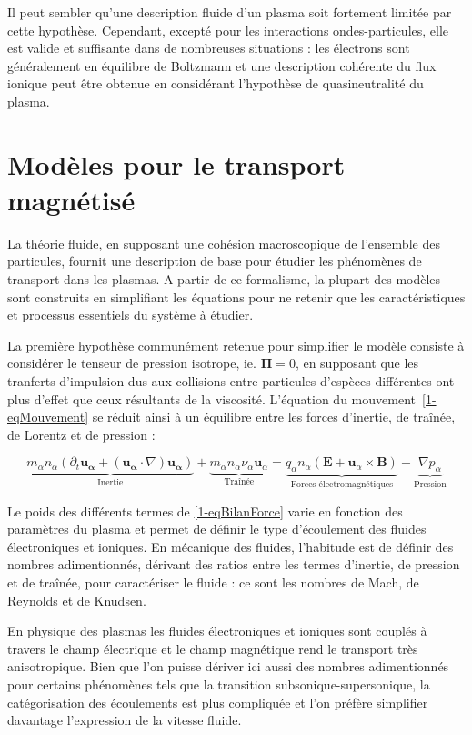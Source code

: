 \begin{refsection}
Il peut sembler qu'une description fluide d'un plasma soit fortement limitée
par cette hypothèse. Cependant, excepté pour les interactions
ondes-particules, elle est valide et suffisante dans de nombreuses
situations : les électrons sont généralement en équilibre de Boltzmann et une
description cohérente du flux ionique peut être obtenue en considérant l'hypothèse de quasineutralité du
plasma.

\section{Modèles pour le transport magnétisé}

La théorie fluide, en supposant une cohésion macroscopique de l'ensemble des
particules, fournit une description de base pour étudier les phénomènes de
transport dans les plasmas. A partir de ce formalisme, la plupart des modèles
sont construits en simplifiant les équations pour ne retenir que les
caractéristiques et processus essentiels du système à étudier. 

La première hypothèse communément retenue pour simplifier le modèle consiste à
considérer le tenseur de pression isotrope, ie.
$\boldsymbol{\Pi}=0$, en supposant que les tranferts d'impulsion dus
aux collisions entre particules d'espèces différentes ont plus d'effet que
ceux résultants de la viscosité. L'équation du
mouvement~\eqref{1-eqMouvement} se réduit ainsi à un équilibre entre les forces
d'inertie, de traînée, de Lorentz et de pression :

\begin{equation}
\label{1-eqBilanForce}
\underbrace{m_\alpha n_\alpha\left(\partial_t \mathbf{u_\alpha} +
(\mathbf{u_\alpha}\cdot\nabla)\mathbf{u_\alpha}\right)}_\text{Inertie}
+\underbrace{m_\alpha n_\alpha\nu_\alpha\mathbf
u_\alpha}_\text{Traînée}=\underbrace{{q_\alpha n_\alpha}\left(\mathbf E+\mathbf
u_\alpha\times \mathbf B\right)}_\text{Forces électromagnétiques}
-\underbrace{{\nabla p_\alpha}}_\text{Pression}
\end{equation}
 
Le poids des différents termes de \eqref{1-eqBilanForce} varie en fonction des
paramètres du plasma et permet de définir le type d'écoulement des fluides
électroniques et ioniques. En mécanique des fluides, l'habitude est de définir
des nombres adimentionnés, dérivant des ratios entre les termes d'inertie, de
pression et de traînée, pour caractériser le fluide : ce sont les nombres de
Mach, de Reynolds et de Knudsen.

En physique des plasmas les fluides électroniques et ioniques sont couplés à
travers le champ électrique et le champ magnétique rend le transport très
anisotropique. Bien que l'on puisse dériver ici aussi des nombres
adimentionnés pour certains phénomènes tels que la transition
subsonique-supersonique, la catégorisation des écoulements est plus compliquée
et l'on préfère simplifier davantage l'expression de la vitesse fluide.


\end{refsection}
